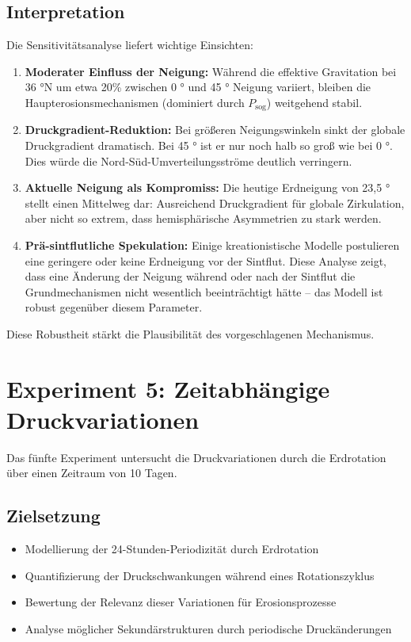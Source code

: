 ﻿\documentclass[12pt,a4paper]{report}
\begin{document}
\subsection{Interpretation}

Die Sensitivitätsanalyse liefert wichtige Einsichten:

\begin{enumerate}
	\item \textbf{Moderater Einfluss der Neigung:} Während die effektive Gravitation bei 36 °N um etwa 20\% zwischen 0 ° und 45 ° Neigung variiert, bleiben die Haupterosionsmechanismen (dominiert durch $P_{\text{sog}}$) weitgehend stabil.
	
	\item \textbf{Druckgradient-Reduktion:} Bei größeren Neigungswinkeln sinkt der globale Druckgradient dramatisch. Bei 45 ° ist er nur noch halb so groß wie bei 0 °. Dies würde die Nord-Süd-Umverteilungsströme deutlich verringern.
	
	\item \textbf{Aktuelle Neigung als Kompromiss:} Die heutige Erdneigung von 23,5 ° stellt einen \glqq Mittelweg\grqq{} dar: Ausreichend Druckgradient für globale Zirkulation, aber nicht so extrem, dass hemisphärische Asymmetrien zu stark werden.
	
	\item \textbf{Prä-sintflutliche Spekulation:} Einige kreationistische Modelle postulieren eine geringere oder keine Erdneigung vor der Sintflut. Diese Analyse zeigt, dass eine Änderung der Neigung während oder nach der Sintflut die Grundmechanismen nicht wesentlich beeinträchtigt hätte -- das Modell ist robust gegenüber diesem Parameter.
\end{enumerate}

Diese Robustheit stärkt die Plausibilität des vorgeschlagenen Mechanismus.

\section{Experiment 5: Zeitabhängige Druckvariationen}

Das fünfte Experiment untersucht die Druckvariationen durch die Erdrotation über einen Zeitraum von 10 Tagen.

\subsection{Zielsetzung}

\begin{itemize}
	\item Modellierung der 24-Stunden-Periodizität durch Erdrotation
	\item Quantifizierung der Druckschwankungen während eines Rotationszyklus
	\item Bewertung der Relevanz dieser Variationen für Erosionsprozesse
	\item Analyse möglicher Sekundärstrukturen durch periodische Druckänderungen
\end{itemize}
\end{document}
